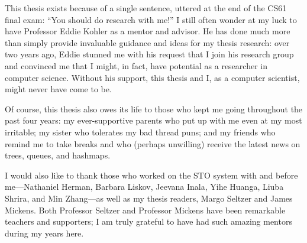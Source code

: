 This thesis exists because of a single sentence, uttered at the end of the CS61 final exam: ``You should do research with me!'' I still often wonder at my luck to have Professor Eddie Kohler as a mentor and advisor. He has done much more than simply provide invaluable guidance and ideas for my thesis research: over two years ago, Eddie stunned me with his request that I join his research group and convinced me that I might, in fact, have potential as a researcher in computer science. Without his support, this thesis and I, as a computer scientist, might never have come to be.

    Of course, this thesis also owes its life to those who kept me going throughout the past four years: my ever-supportive parents who put up with me even at my most irritable; my sister who tolerates my bad thread puns; and my friends who remind me to take breaks and who (perhaps unwilling) receive the latest news on trees, queues, and hashmaps.

        I would also like to thank those who worked on the STO system with and before me---Nathaniel Herman, Barbara Liskov, Jeevana Inala, Yihe Huanga, Liuba Shrira, and Min Zhang---as well as my thesis readers, Margo Seltzer and James Mickens. Both Professor Seltzer and Professor Mickens have been remarkable teachers and supporters; I am truly grateful to have had such amazing mentors during my years here.
